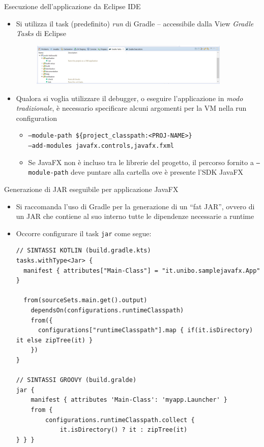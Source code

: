 \documentclass[presentation]{beamer}
\begin{document}
\begin{frame}{Esecuzione dell'applicazione da Eclipse IDE}
\begin{itemize}\itemsep20pt
\item Si utilizza il task (predefinito) \emph{run} di Gradle -- accessibile dalla View \emph{Gradle Tasks} di Eclipse
\begin{figure}
\includegraphics[width=0.9\textwidth]{img/gradle-tasks-view.png}
\end{figure}
\end{itemize}
\begin{itemize}
\item Qualora si voglia utilizzare il debugger, o eseguire l'applicazione in \emph{modo tradizionale}, è necessario specificare alcuni argomenti per la VM nella run configuration
\begin{itemize}
\item \texttt{--module-path \$\{project\_classpath:<PROJ-NAME>\}\\--add-modules javafx.controls,javafx.fxml}
\item Se JavaFX non è incluso tra le librerie del progetto, il percorso fornito a \texttt{--module-path} deve puntare alla cartella ove è presente l'SDK JavaFX
\end{itemize}
\end{itemize}
\end{frame}

\begin{frame}[fragile]{Generazione di JAR eseguibile per applicazione JavaFX}

\begin{itemize}
\item Si raccomanda l'uso di Gradle per la generazione di un ``fat JAR'', ovvero di un JAR che contiene al suo interno tutte le dipendenze necessarie a runtime
\item Occorre configurare il task \texttt{jar} come segue:
\begin{lstlisting}[basicstyle=\tiny]
// SINTASSI KOTLIN (build.gradle.kts)
tasks.withType<Jar> {
  manifest { attributes["Main-Class"] = "it.unibo.samplejavafx.App" }

  from(sourceSets.main.get().output)
    dependsOn(configurations.runtimeClasspath)
    from({
      configurations["runtimeClasspath"].map { if(it.isDirectory) it else zipTree(it) }
    })
}

// SINTASSI GROOVY (build.gralde)
jar {
    manifest { attributes 'Main-Class': 'myapp.Launcher' }
    from {
        configurations.runtimeClasspath.collect {
        	it.isDirectory() ? it : zipTree(it)
} } }
\end{lstlisting}
\end{itemize}
\end{frame}
\end{document}
